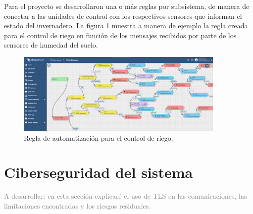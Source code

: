 Para el proyecto se desarrollaron una o más reglas por subsistema, de manera de conectar a las unidades de control con los respectivos sensores que informan el estado del invernadero. La figura \ref{fig:rule_riego} muestra a manera de ejemplo la regla creada para el control de riego en función de los mensajes recibidos por parte de los sensores de humedad del suelo.

\begin{figure}[!h]
	\centering
	\includegraphics[width=0.9\textwidth]{./Figures/chapter3/TB_Rule_Soil.jpg}
	\caption[Regla de automatización para el control de riego]{Regla de automatización para el control de riego.}
	\label{fig:rule_riego}
\end{figure}

\pagebreak
\section{Ciberseguridad del sistema}
\label{sec:Ciberseguridad del sistema}
\textcolor{gray}{A desarrollar: en esta sección explicaré el uso de TLS en las comunicaciones, las limitaciones encontradas y los riesgos residuales. }

